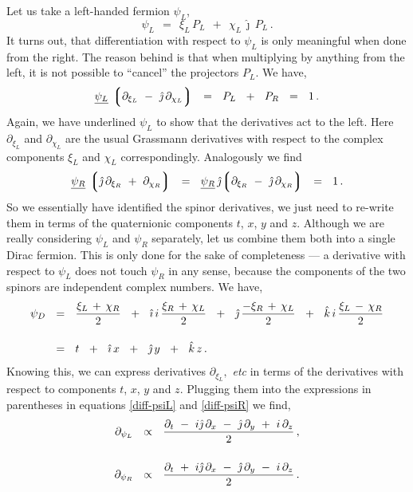 \documentclass[epsfig,12pt]{article}
\newcommand{\p}{\partial}
\newcommand{\lgr}{\left\lgroup}
\newcommand{\rgr}{\right\rgroup}
\newcommand{\ii}{\hat\imath}
\newcommand{\jj}{\hat\jmath}
\newcommand{\kk}{\hat k}
\begin{document}
	Let us take a left-handed fermion $ \psi_L $,
\begin{equation}
	\psi_L	~~=~~	\xi_L\,P_L  ~~+~~  \chi_L\,\jj\,P_L\,.
\end{equation}
	It turns out, that differentiation with respect to $ \psi_L $ is only
	meaningful when done from the right.
	The reason behind is that when multiplying by anything from the left, it is 
	not possible to ``cancel'' the projectors $ P_L $.
	We have,
\begin{equation}
\label{diff-psiL}
	\underline{\psi_L}\, \lgr \p_{\xi_L} ~-~ \jj\, \p_{\chi_L} \rgr
	~~=~~
	P_L  ~~+~~  P_R
	~~=~~
	1\,.
\end{equation}
	Again, we have underlined $ \psi_L $ to show that the derivatives act to the left.
	Here $ \p_{\xi_L} $ and $ \p_{\chi_L} $ are the usual Grassmann derivatives with respect to
	the complex components $ \xi_L $ and $ \chi_L $ correspondingly.
	Analogously we find
\begin{equation}
\label{diff-psiR}
	\underline{\psi_R}\, \lgr \jj\, \p_{\xi_R} ~+~ \p_{\chi_R} \rgr	~~=~~
	\underline{\psi_R}\, \jj\! \lgr \p_{\xi_R} ~-~ \jj\, \p_{\chi_R} \rgr	~~=~~
	1\,.
\end{equation}
	So we essentially have identified the spinor derivatives, we just need to re-write them
	in terms of the quaternionic components $ t $, $ x $, $ y $ and $ z $.
	Although we are really considering $ \psi_L $ and $ \psi_R $ separately,
	let us combine them both into a single Dirac fermion.
	This is only done for the sake of completeness --- a derivative with respect to $ \psi_L $
	does not touch $ \psi_R $ in any sense, 
	because the components of the two spinors are independent complex numbers.
	We have,
\begin{align}
%
\notag
	\psi_D	& ~~=~~
	\frac{ \xi_L \,+\, \chi_R } 2  ~~+~~
	\ii\, i\,\frac{\xi_R \,+\, \chi_L} 2  ~~+~~
	\jj\, \frac{-\xi_R \,+\, \chi_L} 2  ~~+~~
	\kk\, i\,\frac{\xi_L \,-\, \chi_R} 2
	\\[4mm]
%
\label{psiD-as-quat}
	& ~~=~~
	t  ~~+~~  \ii\, x  ~~+~~  \jj\, y  ~~+~~  \kk\, z\,.
\end{align}
	Knowing this, we can express derivatives $ \p_{\xi_L}, $ \emph{etc} in terms
	of the derivatives with respect to components $ t $, $ x $, $ y $ and $ z $.
	Plugging them into the expressions in parentheses in equations
	\eqref{diff-psiL} and \eqref{diff-psiR} we find,
\begin{align}
%
\notag
	\p_{\psi_L}	& ~~\propto~~
	\frac{\p_t ~-~ i\jj\,\p_x ~-~ \jj\,\p_y ~+~ i\,\p_z} 2\,,
	\\[5mm]
%
\label{prelim-psi-der}
	\p_{\psi_R}	& ~~\propto~~
	\frac{\p_t ~+~ i\jj\,\p_x ~-~ \jj\,\p_y ~-~ i\,\p_z} 2\,.
\end{align}
\end{document}
